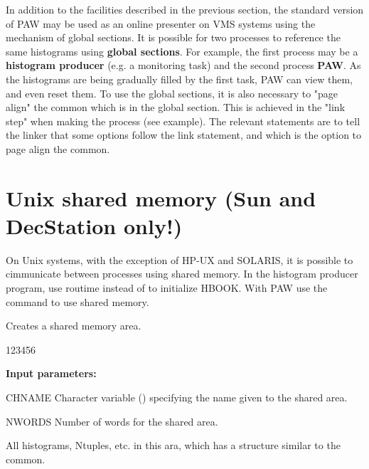 In addition to the facilities described in the previous section,
the standard version of PAW may be used as an online presenter
on VMS systems using the mechanism of global sections.
It is possible for two processes to reference the same histograms
using {\bf global sections}.
For example, the first process may be a {\bf histogram producer}
(e.g. a monitoring task) and the second process  {\bf PAW}.
As the
histograms are being gradually filled by the first task, PAW can
view them, and even reset them.
To use the global sections, it is also necessary to "page align" the common
which is in the global section. This is achieved in the "link step" when making
the process (see example).
The relevant statements are 
to tell the linker that some options follow the link statement,
and  which is the option to
page align the  common.

\newpage

\section{Unix shared memory (Sun and DecStation only!)}
\label{sec:unixshared}

On Unix systems, with the exception of HP-UX and SOLARIS, 
%
it is possible to cimmunicate between processes using
shared memory. 
In the histogram producer program, use routime 
instead of  to initialize HBOOK.
With PAW use the command  to use shared memory.


\Action
Creates a shared memory area.

\begin{DLtt}{123456}
\item[{\rm\bf Input parameters:}]
\item[CHNAME] Character variable () specifying the name
              given to the shared area.
\item[NWORDS] Number of words for the shared area.
\end{DLtt}

All histograms, Ntuples, etc. in this ara, which has a structure
similar to the  common.

